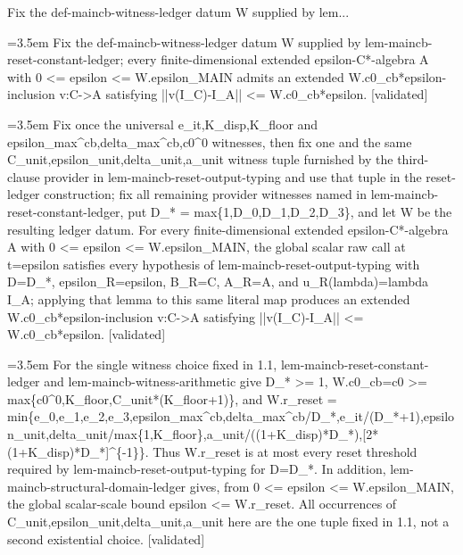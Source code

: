 \documentclass{article}
\newcommand{\step}[1]{\par\noindent\hangindent=3.5em\hangafter=1%
  \makebox[3.5em][l]{\textbf{#1.}}}
\newcommand{\steptag}[1]{\hfill{\small\textsf{[#1]}}}
\begin{document}
\begin{proofbox}{Fix the def-maincb-witness-ledger datum W supplied by lem...}
\step{1} Fix the def-maincb-witness-ledger datum W supplied by lem-maincb-reset-constant-ledger; every finite-dimensional extended epsilon-C*-algebra A with 0 <= epsilon <= W.epsilon\_MAIN admits an extended W.c0\_cb*epsilon-inclusion v:C->A satisfying ||v(I\_C)-I\_A|| <= W.c0\_cb*epsilon. \steptag{validated} \\[6pt]
\step{1.1} Fix once the universal e\_it,K\_disp,K\_floor and epsilon\_max\textasciicircum{}cb,delta\_max\textasciicircum{}cb,c0\textasciicircum{}0 witnesses, then fix one and the same C\_unit,epsilon\_unit,delta\_unit,a\_unit witness tuple furnished by the third-clause provider in lem-maincb-reset-output-typing and use that tuple in the reset-ledger construction; fix all remaining provider witnesses named in lem-maincb-reset-constant-ledger, put D\_* = max\{1,D\_0,D\_1,D\_2,D\_3\}, and let W be the resulting ledger datum. For every finite-dimensional extended epsilon-C*-algebra A with 0 <= epsilon <= W.epsilon\_MAIN, the global scalar raw call at t=epsilon satisfies every hypothesis of lem-maincb-reset-output-typing with D=D\_*, epsilon\_R=epsilon, B\_R=C, A\_R=A, and u\_R(lambda)=lambda I\_A; applying that lemma to this same literal map produces an extended W.c0\_cb*epsilon-inclusion v:C->A satisfying ||v(I\_C)-I\_A|| <= W.c0\_cb*epsilon. \steptag{validated} \\[6pt]
\step{1.1.1} For the single witness choice fixed in 1.1, lem-maincb-reset-constant-ledger and lem-maincb-witness-arithmetic give D\_* >= 1, W.c0\_cb=c0 >= max\{c0\textasciicircum{}0,K\_floor,C\_unit*(K\_floor+1)\}, and W.r\_reset = min\{e\_0,e\_1,e\_2,e\_3,epsilon\_max\textasciicircum{}cb,delta\_max\textasciicircum{}cb/D\_*,e\_it/(D\_*+1),epsilon\_unit,delta\_unit/max\{1,K\_floor\},a\_unit/((1+K\_disp)*D\_*),[2*(1+K\_disp)*D\_*]\textasciicircum{}\{-1\}\}. Thus W.r\_reset is at most every reset threshold required by lem-maincb-reset-output-typing for D=D\_*. In addition, lem-maincb-structural-domain-ledger gives, from 0 <= epsilon <= W.epsilon\_MAIN, the global scalar-scale bound epsilon <= W.r\_reset. All occurrences of C\_unit,epsilon\_unit,delta\_unit,a\_unit here are the one tuple fixed in 1.1, not a second existential choice. \steptag{validated} \\[4pt]

\end{proofbox}
\end{document}
